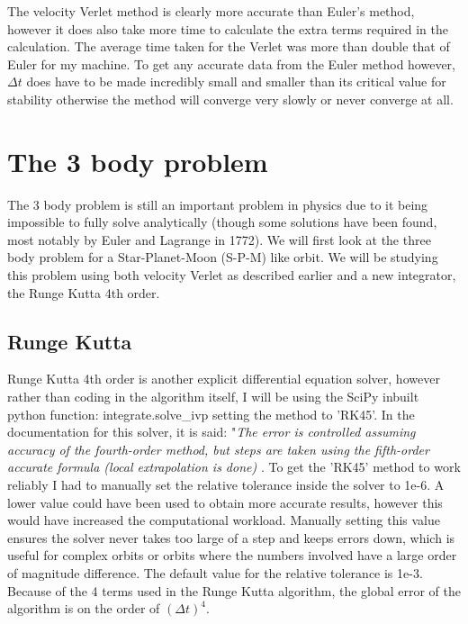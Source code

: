 \documentclass[11pt]{article}
\begin{document}
The velocity Verlet method is clearly more accurate than Euler's method, however it does also take more time to calculate the extra terms required in the calculation. The average time taken for the Verlet was more than double that of Euler for my machine. To get any accurate data from the Euler method however, $\Delta t$ does have to be made incredibly small and smaller than its critical value for stability otherwise the method will converge very slowly or never converge at all. 


\centering
\section{The 3 body problem}
\raggedright

The 3 body problem is still an important problem in physics due to it being impossible to fully solve analytically (though some solutions have been found, most notably by Euler and Lagrange in 1772). We will first look at the three body problem for a Star-Planet-Moon (S-P-M) like orbit. We will be studying this problem using both velocity Verlet as described earlier and a new integrator, the Runge Kutta 4th order.

\subsection{Runge Kutta}

Runge Kutta 4th order is another explicit differential equation solver, however rather than coding in the algorithm itself, I will be using the SciPy inbuilt python function: integrate.solve\_ivp setting the method to 'RK45'. In the documentation for this solver, it is said: "\textit{The error is controlled assuming accuracy of the fourth-order method, but steps are taken using the fifth-order accurate formula (local extrapolation is done)} \cite{SciPy}. To get the 'RK45' method to work reliably I had to manually set the relative tolerance inside the solver to 1e-6. A lower value could have been used to obtain more accurate results, however this would have increased the computational workload. Manually setting this value ensures the solver never takes too large of a step and keeps errors down, which is useful for complex orbits or orbits where the numbers involved have a large order of magnitude difference. The default value for the relative tolerance is 1e-3. Because of the 4 terms used in the Runge Kutta algorithm, the global error of the algorithm is on the order of $(\Delta t)^4$. \cite{RK45Error}
\end{document}

